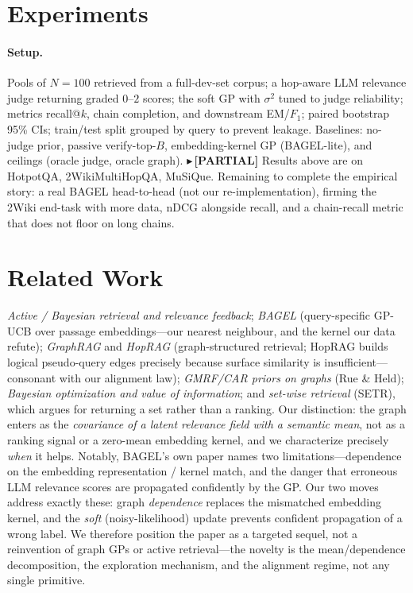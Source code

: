 \documentclass[11pt]{article}
\newcommand{\PARTIAL}[1]{{\color{orange}\small$\blacktriangleright$\,\textbf{[PARTIAL]} #1}}
\begin{document}
\section{Experiments}\label{sec:exp}
\paragraph{Setup.} Pools of $N{=}100$ retrieved from a full-dev-set corpus; a hop-aware LLM relevance judge
returning graded $0$--$2$ scores; the soft GP with $\sigma^2$ tuned to judge reliability; metrics recall@$k$,
chain completion, and downstream EM/$F_1$; paired bootstrap 95\% CIs; train/test split grouped by query to
prevent leakage. Baselines: no-judge prior, passive verify-top-$B$, embedding-kernel GP (BAGEL-lite), and
ceilings (oracle judge, oracle graph).
\PARTIAL{Results above are on HotpotQA, 2WikiMultiHopQA, MuSiQue. Remaining to complete the empirical story: a
real BAGEL head-to-head (not our re-implementation), firming the 2Wiki end-task with more data, nDCG alongside
recall, and a chain-recall metric that does not floor on long chains.}

\section{Related Work}
\emph{Active / Bayesian retrieval and relevance feedback}; \emph{BAGEL} (query-specific GP-UCB over passage
embeddings---our nearest neighbour, and the kernel our data refute); \emph{GraphRAG} and \emph{HopRAG}
(graph-structured retrieval; HopRAG builds logical pseudo-query edges precisely because surface similarity is
insufficient---consonant with our alignment law); \emph{GMRF/CAR priors on graphs} (Rue \& Held); \emph{Bayesian
optimization and value of information}; and \emph{set-wise retrieval} (SETR), which argues for returning a set
rather than a ranking. Our distinction: the graph enters as the \emph{covariance of a latent relevance field with
a semantic mean}, not as a ranking signal or a zero-mean embedding kernel, and we characterize precisely
\emph{when} it helps. Notably, BAGEL's own paper names two limitations---dependence on the embedding
representation / kernel match, and the danger that erroneous LLM relevance scores are propagated confidently by
the GP. Our two moves address exactly these: graph \emph{dependence} replaces the mismatched embedding kernel,
and the \emph{soft} (noisy-likelihood) update prevents confident propagation of a wrong label. We therefore
position the paper as a targeted sequel, not a reinvention of graph GPs or active retrieval---the novelty is the
mean/dependence decomposition, the exploration mechanism, and the alignment regime, not any single primitive.
\end{document}
